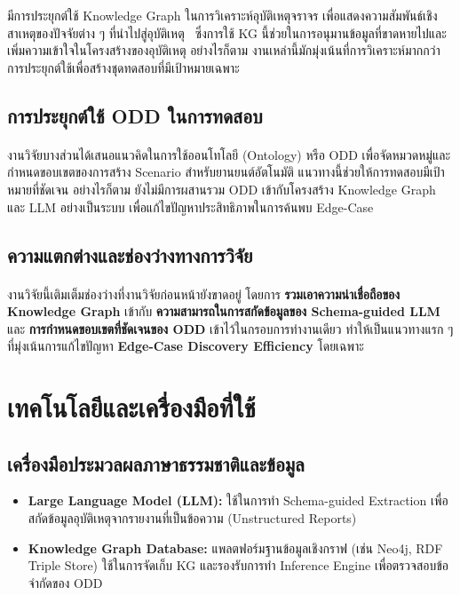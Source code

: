 มีการประยุกต์ใช้ Knowledge Graph ในการวิเคราะห์อุบัติเหตุจราจร เพื่อแสดงความสัมพันธ์เชิงสาเหตุของปัจจัยต่าง ๆ ที่นำไปสู่อุบัติเหตุ~\cite{liyan2022analysis} ซึ่งการใช้ KG นี้ช่วยในการอนุมานข้อมูลที่ขาดหายไปและเพิ่มความเข้าใจในโครงสร้างของอุบัติเหตุ อย่างไรก็ตาม งานเหล่านี้มักมุ่งเน้นที่การวิเคราะห์มากกว่าการประยุกต์ใช้เพื่อสร้างชุดทดสอบที่มีเป้าหมายเฉพาะ

\subsection{การประยุกต์ใช้ ODD ในการทดสอบ}\paragraph{}

งานวิจัยบางส่วนได้เสนอแนวคิดในการใช้ออนโทโลยี (Ontology) หรือ ODD เพื่อจัดหมวดหมู่และกำหนดขอบเขตของการสร้าง Scenario สำหรับยานยนต์อัตโนมัติ \cite{bagschik2018ontology} แนวทางนี้ช่วยให้การทดสอบมีเป้าหมายที่ชัดเจน อย่างไรก็ตาม ยังไม่มีการผสานรวม ODD เข้ากับโครงสร้าง Knowledge Graph และ LLM อย่างเป็นระบบ เพื่อแก้ไขปัญหาประสิทธิภาพในการค้นพบ Edge-Case

\subsection{ความแตกต่างและช่องว่างทางการวิจัย}\paragraph{}

งานวิจัยนี้เติมเต็มช่องว่างที่งานวิจัยก่อนหน้ายังขาดอยู่ โดยการ \textbf{รวมเอาความน่าเชื่อถือของ Knowledge Graph} เข้ากับ \textbf{ความสามารถในการสกัดข้อมูลของ Schema-guided LLM} และ \textbf{การกำหนดขอบเขตที่ชัดเจนของ ODD} เข้าไว้ในกรอบการทำงานเดียว ทำให้เป็นแนวทางแรก ๆ ที่มุ่งเน้นการแก้ไขปัญหา \textbf{Edge-Case Discovery Efficiency} โดยเฉพาะ

\section{เทคโนโลยีและเครื่องมือที่ใช้}

\subsection{เครื่องมือประมวลผลภาษาธรรมชาติและข้อมูล}
\begin{itemize}
 \item \textbf{Large Language Model (LLM):} ใช้ในการทำ Schema-guided Extraction เพื่อสกัดข้อมูลอุบัติเหตุจากรายงานที่เป็นข้อความ (Unstructured Reports)
 \item \textbf{Knowledge Graph Database:} แพลตฟอร์มฐานข้อมูลเชิงกราฟ (เช่น Neo4j, RDF Triple Store) ใช้ในการจัดเก็บ KG และรองรับการทำ Inference Engine เพื่อตรวจสอบข้อจำกัดของ ODD
\end{itemize}

